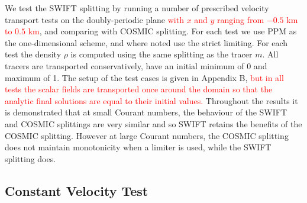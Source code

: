 \documentclass{ametsocV6.1}
\newcommand{\change}[1]{\textcolor{red}{#1}}
\begin{document}
We test the SWIFT splitting by running a number of prescribed velocity transport tests on the doubly-periodic plane \change{with $x$ and $y$ ranging from $-0.5$ km to $0.5$ km}, and comparing with COSMIC splitting. For each test we use PPM as the one-dimensional scheme, and where noted use the strict limiting. For each test the density $\rho$ is computed using the same splitting as the tracer $m$.
All tracers are transported conservatively, have an initial minimum of 0 and maximum of 1.
The setup of the test cases is given in Appendix B, \change{but in all tests the scalar fields are transported once around the domain so that the analytic final solutions are equal to their initial values.}
Throughout the results it is demonstrated that at small Courant numbers, the behaviour of the SWIFT and COSMIC splittings are very similar and so SWIFT retains the benefits of the COSMIC splitting. However at large Courant numbers, the COSMIC splitting does not maintain monotonicity when a limiter is used, while the SWIFT splitting does.

\subsection{Constant Velocity Test} \label{sec:test1}
\end{document}
